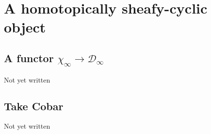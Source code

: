 \documentclass[12pt]{nuthesis}
\theoremstyle{definition}
\theoremstyle{remark}
\theoremstyle{example}
\begin{document}
\chapter{A homotopically sheafy-cyclic object}
	
	
	
	\section{A functor $\chi_\infty \to \mathcal{D}_\infty$}
		Not yet written
	\section{Take Cobar}		
		Not yet written



%


% 



\appendix		%




\end{document}
